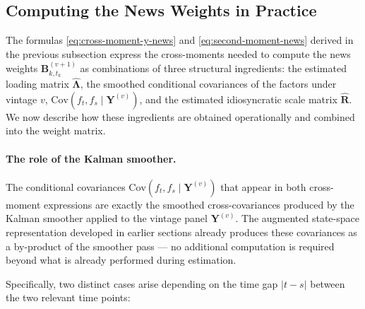 \documentclass[11pt, a4paper, oneside]{article}
\begin{document}
\subsection{Computing the News Weights in Practice}
\label{subsec:news-weights}

The formulas \eqref{eq:cross-moment-y-news} and
\eqref{eq:second-moment-news} derived in the previous subsection
express the cross-moments needed to compute the news weights
$\mathbf{B}^{(v+1)}_{k, t_k}$ as combinations of three structural
ingredients: the estimated loading matrix $\hat{\boldsymbol{\Lambda}}$,
the smoothed conditional covariances of the factors under vintage
$v$, $\mathrm{Cov}(f_t, f_s \mid \mathbf{Y}^{(v)})$, and the estimated
idiosyncratic scale matrix $\hat{\mathbf{R}}$. We now describe how
these ingredients are obtained operationally and combined into the
weight matrix.

\paragraph{The role of the Kalman smoother.}
The conditional covariances $\mathrm{Cov}(f_t, f_s \mid \mathbf{Y}^{(v)})$
that appear in both cross-moment expressions are exactly the smoothed
cross-covariances produced by the Kalman smoother applied to the
vintage panel $\mathbf{Y}^{(v)}$. The augmented state-space
representation developed in earlier sections already produces these
covariances as a by-product of the smoother pass — no additional
computation is required beyond what is already performed during
estimation.

Specifically, two distinct cases arise depending on the time gap
$|t - s|$ between the two relevant time points:
\end{document}
